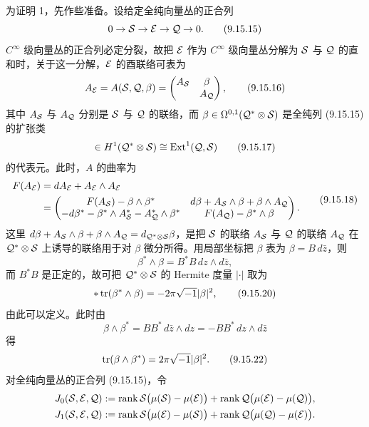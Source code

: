 为证明 1，先作些准备。设给定全纯向量丛的正合列
\begin{equation}
  0\to\mathcal{S}\to\mathcal{E}\to\mathcal{Q}\to0.
  \tag{9.15.15}
\end{equation}
$C^\infty$ 级向量丛的正合列必定分裂，故把 $\mathcal{E}$ 作为 $C^\infty$ 级向量丛分解为 $\mathcal{S}$ 与 $\mathcal{Q}$ 的直和时，关于这一分解，$\mathcal{E}$ 的酉联络可表为
\begin{equation}
  A_{\mathcal{E}}=A(\mathcal{S},\mathcal{Q},\beta)
  =\begin{pmatrix}A_{\mathcal{S}}&\beta\\*&A_{\mathcal{Q}}\end{pmatrix},
  \tag{9.15.16}
\end{equation}
其中 $A_{\mathcal{S}}$ 与 $A_{\mathcal{Q}}$ 分别是 $\mathcal{S}$ 与 $\mathcal{Q}$ 的联络，而 $\beta\in\Omega^{0,1}(\mathcal{Q}^*\otimes\mathcal{S})$ 是全纯列 (9.15.15) 的扩张类
\begin{equation}
  [\beta]\in H^1(\cQ^*\otimes\cS)\cong\Ext^1(\cQ,\cS)
  \tag{9.15.17}
\end{equation}
的代表元。此时，$A$ 的曲率为
\begin{equation}
  \begin{aligned}
    F(A_{\mathcal{E}})&=dA_{\mathcal{E}}+A_{\mathcal{E}}\wedge A_{\mathcal{E}}\\
    &=\begin{pmatrix}
      F(A_{\mathcal{S}})-\beta\wedge\beta^* & d\beta+A_{\mathcal{S}}\wedge\beta+\beta\wedge A_{\mathcal{Q}}\\
      -d\beta^*-\beta^*\wedge A_{\mathcal{S}}^*-A_{\mathcal{Q}}^*\wedge\beta^* & F(A_{\mathcal{Q}})-\beta^*\wedge\beta
    \end{pmatrix}.
  \end{aligned}
  \tag{9.15.18}
\end{equation}
这里 $d\beta+A_{\mathcal{S}}\wedge\beta+\beta\wedge A_{\mathcal{Q}}=d_{\mathcal{Q}^*\otimes\mathcal{S}}\beta$，是把 $\mathcal{S}$ 的联络 $A_{\mathcal{S}}$ 与 $\mathcal{Q}$ 的联络 $A_{\mathcal{Q}}$ 在 $\mathcal{Q}^*\otimes\mathcal{S}$ 上诱导的联络用于对 $\beta$ 微分所得。用局部坐标把 $\beta$ 表为 $\beta=B\,d\bar z$，则
\begin{equation}
  \beta^*\wedge\beta=B^*B\,dz\wedge d\bar z,
  \tag{9.15.19}
\end{equation}
而 $B^*B$ 是正定的，故可把 $\mathcal{Q}^*\otimes\mathcal{S}$ 的 Hermite 度量 $|\cdot|$ 取为
\begin{equation}
  \ast\operatorname{tr}(\beta^*\wedge\beta)=-2\pi\sqrt{-1}|\beta|^2,
  \tag{9.15.20}
\end{equation}
由此可以定义。此时由
\begin{equation}
  \beta\wedge\beta^*=BB^*\,d\bar z\wedge dz=-BB^*\,dz\wedge d\bar z
  \tag{9.15.21}
\end{equation}
得
\begin{equation}
  \operatorname{tr}(\beta\wedge\beta^*)=2\pi\sqrt{-1}|\beta|^2.
  \tag{9.15.22}
\end{equation}
对全纯向量丛的正合列 (9.15.15)，令
\begin{align*}
  J_0(\mathcal{S},\mathcal{E},\mathcal{Q})&:=\operatorname{rank}\mathcal{S}\bigl(\mu(\mathcal{S})-\mu(\mathcal{E})\bigr)+\operatorname{rank}\mathcal{Q}\bigl(\mu(\mathcal{E})-\mu(\mathcal{Q})\bigr),\\
  J_1(\mathcal{S},\mathcal{E},\mathcal{Q})&:=\operatorname{rank}\mathcal{S}\bigl(\mu(\mathcal{E})-\mu(\mathcal{S})\bigr)+\operatorname{rank}\mathcal{Q}\bigl(\mu(\mathcal{Q})-\mu(\mathcal{E})\bigr).
\end{align*}

